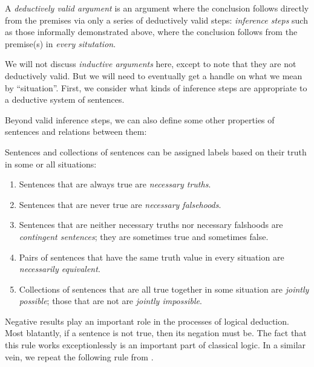 \begin{definition}
  A \emph{deductively valid argument} is an argument where the conclusion
  follows directly from the premises via only a series of deductively valid
  steps: \emph{inference steps} such as those informally demonstrated above,
  where the conclusion follows from the premise(s) in \emph{every situtation}.
  \label{def:deductively-valid}
\end{definition}

We will not discuss \emph{inductive arguments} here, except to note that they
are not deductively valid. But we will need to eventually get a handle on what
we mean by ``situation''. First, we consider what kinds of inference steps are
appropriate to a deductive system of sentences.

Beyond valid inference steps, we can also define some other properties of
sentences and relations between them:

\begin{definition}
  Sentences and collections of sentences can be assigned labels based on their
  truth in some or all situations:
  
  \begin{enumerate}
  \item Sentences that are always true are \emph{necessary truths}.
  \item Sentences that are never true are \emph{necessary falsehoods}.
  \item Sentences that are neither necessary truths nor necessary falshoods are
    \emph{contingent sentences}; they are sometimes true and sometimes false.
  \item Pairs of sentences that have the same truth value in every situation
    are \emph{necessarily equivalent}.
  \item Collections of sentences that are all true together in some situation
    are \emph{jointly possible}; those that are not are \emph{jointly
    impossible}.
  \end{enumerate}
  
\end{definition}

Negative results play an important role in the processes of logical deduction.
Most blatantly, if a sentence is not true, then its negation must be. The fact
that this rule works exceptionlessly is an important part of classical logic. In
a similar vein, we repeat the following rule from \cite[p. 13]{Smi20}.

